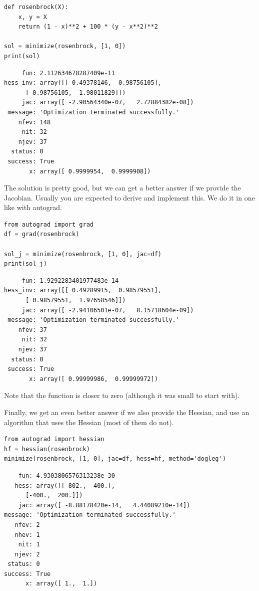 \documentclass[11pt]{article}
\begin{document}
\begin{verbatim}
def rosenbrock(X):
    x, y = X
    return (1 - x)**2 + 100 * (y - x**2)**2

sol = minimize(rosenbrock, [1, 0])
print(sol)
\end{verbatim}

\begin{verbatim}
     fun: 2.112634678287409e-11
hess_inv: array([[ 0.49378146,  0.98756105],
      [ 0.98756105,  1.98011829]])
     jac: array([ -2.90564340e-07,   2.72884382e-08])
 message: 'Optimization terminated successfully.'
    nfev: 148
     nit: 32
    njev: 37
  status: 0
 success: True
       x: array([ 0.9999954,  0.9999908])

\end{verbatim}

The solution is pretty good, but we can get a better answer if we provide the Jacobian. Usually you are expected to derive and implement this. We do it in one like with autograd.

\begin{verbatim}
from autograd import grad
df = grad(rosenbrock)

sol_j = minimize(rosenbrock, [1, 0], jac=df)
print(sol_j)
\end{verbatim}

\begin{verbatim}
     fun: 1.9292283401977483e-14
hess_inv: array([[ 0.49289915,  0.98579551],
      [ 0.98579551,  1.97658546]])
     jac: array([ -2.94106501e-07,   8.15718604e-09])
 message: 'Optimization terminated successfully.'
    nfev: 37
     nit: 32
    njev: 37
  status: 0
 success: True
       x: array([ 0.99999986,  0.99999972])

\end{verbatim}

Note that the function is closer to zero (although it was small to start with).

Finally, we get an even better answer if we also provide the Hessian, and use an algorithm that uses the Hessian (most of them do not).

\begin{verbatim}
from autograd import hessian
hf = hessian(rosenbrock)
minimize(rosenbrock, [1, 0], jac=df, hess=hf, method='dogleg')
\end{verbatim}

\begin{verbatim}
    fun: 4.9303806576313238e-30
   hess: array([[ 802., -400.],
      [-400.,  200.]])
    jac: array([ -8.88178420e-14,   4.44089210e-14])
message: 'Optimization terminated successfully.'
   nfev: 2
   nhev: 1
    nit: 1
   njev: 2
 status: 0
success: True
      x: array([ 1.,  1.])
\end{verbatim}
\end{document}
